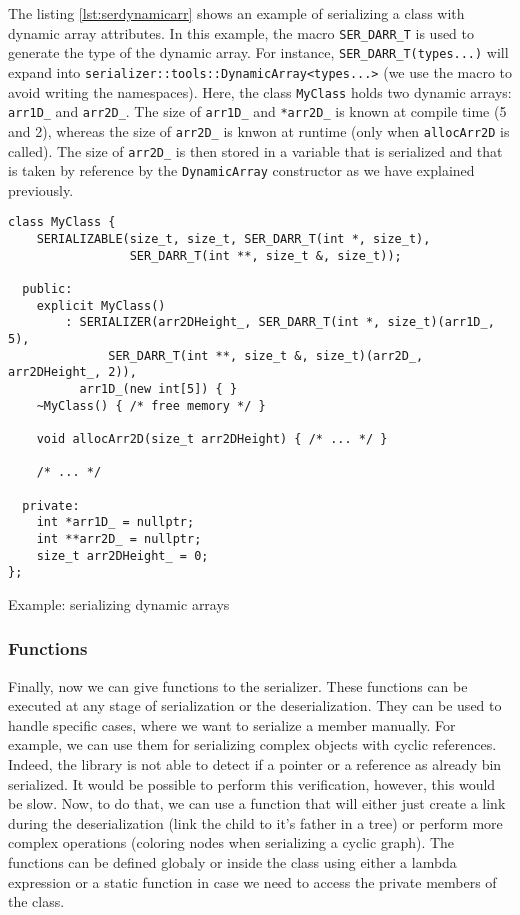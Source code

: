 The listing \ref{lst:serdynamicarr} shows an example of serializing a class with
dynamic array attributes. In this example, the macro \texttt{SER\_DARR\_T} is
used to generate the type of the dynamic array. For instance,
\texttt{SER\_DARR\_T(types...)} will expand into
\texttt{serializer::tools::DynamicArray<types...>} (we use the macro to avoid
writing the namespaces). Here, the class \texttt{MyClass} holds two dynamic
arrays: \texttt{arr1D\_} and \texttt{arr2D\_}. The size of \texttt{arr1D\_} and
\texttt{*arr2D\_} is known at compile time (5 and 2), whereas the size of
\texttt{arr2D\_} is knwon at runtime (only when \texttt{allocArr2D} is called).
The size of \texttt{arr2D\_} is then stored in a variable that is serialized and
that is taken by reference by the \texttt{DynamicArray} constructor as we have
explained previously.

\begin{listing}[ht!]
\begin{verbatim}
class MyClass {
    SERIALIZABLE(size_t, size_t, SER_DARR_T(int *, size_t),
                 SER_DARR_T(int **, size_t &, size_t));

  public:
    explicit MyClass()
        : SERIALIZER(arr2DHeight_, SER_DARR_T(int *, size_t)(arr1D_, 5),
              SER_DARR_T(int **, size_t &, size_t)(arr2D_, arr2DHeight_, 2)),
          arr1D_(new int[5]) { }
    ~MyClass() { /* free memory */ }

    void allocArr2D(size_t arr2DHeight) { /* ... */ }

    /* ... */

  private:
    int *arr1D_ = nullptr;
    int **arr2D_ = nullptr;
    size_t arr2DHeight_ = 0;
};
\end{verbatim}
\caption{Example: serializing dynamic arrays}
\label{lst:serdynamicarr}
\end{listing}

\subsubsection{Functions}

Finally, now we can give functions to the serializer. These functions can be
executed at any stage of serialization or the deserialization. They can be used
to handle specific cases, where we want to serialize a member manually. For
example, we can use them for serializing complex objects with cyclic references.
Indeed, the library is not able to detect if a pointer or a reference as already
bin serialized. It would be possible to perform this verification, however, this
would be slow. Now, to do that, we can use a function that will either just
create a link during the deserialization (link the child to it's father in a
tree) or perform more complex operations (coloring nodes when serializing a
cyclic graph). The functions can be defined globaly or inside the class using
either a lambda expression or a static function in case we need to access the
private members of the class.

